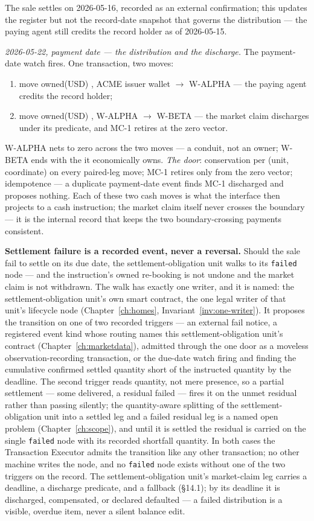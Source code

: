 The sale settles on 2026-05-16, recorded as an external confirmation; this updates
the register but not the record-date snapshot that governs the distribution --- the
paying agent still credits the record holder as of 2026-05-15.

\emph{2026-05-22, payment date --- the distribution and the discharge.} The
payment-date watch fires. One transaction, two moves:
\begin{enumerate}[label=(\arabic*),nosep]
\item move owned(USD) , ACME issuer wallet $\to$ W-ALPHA --- the paying
agent credits the record holder;
\item move owned(USD) , W-ALPHA $\to$ W-BETA --- the market claim
discharges under its predicate, and MC-1 retires at the zero vector.
\end{enumerate}
W-ALPHA nets to zero across the two moves --- a conduit, not an owner; W-BETA ends
with the  it economically owns. \emph{The door}: conservation per
(unit, coordinate) on every paired-leg move; MC-1 retires only from the zero vector;
idempotence --- a duplicate payment-date event finds MC-1 discharged and proposes
nothing. Each of these two cash moves is what the interface then projects to a cash
instruction; the market claim itself never crosses the boundary --- it is the
internal record that keeps the two boundary-crossing payments consistent.

\medskip\noindent\textbf{Settlement failure is a recorded event, never a reversal.}
Should the sale fail to settle on its due date, the settlement-obligation unit walks
to its \texttt{failed} node --- and the instruction's owned re-booking is not undone
and the market claim is not withdrawn. The walk has exactly one writer, and it is
named: the settlement-obligation unit's own smart contract, the one legal writer of
that unit's lifecycle node (Chapter~\ref{ch:homes}, Invariant~\ref{inv:one-writer}).
It proposes the transition on one of two recorded triggers --- an external fail
notice, a registered event kind whose routing names this settlement-obligation unit's
contract (Chapter~\ref{ch:marketdata}), admitted through the one door as a moveless
observation-recording transaction, or the due-date watch firing and finding the cumulative
confirmed settled quantity short of the instructed quantity by the deadline. The
second trigger reads quantity, not mere presence, so a partial settlement --- some
delivered, a residual failed --- fires it on the unmet residual rather than passing
silently; the quantity-aware splitting of the settlement-obligation unit into a
settled leg and a failed residual leg is a named open problem (Chapter~\ref{ch:scope}),
and until it is settled the residual is carried on the single \texttt{failed} node with
its recorded shortfall quantity. In both cases the Transaction Executor admits the
transition like any other transaction; no other machine writes the node, and no
\texttt{failed} node exists without one of the two triggers on the record. The settlement-obligation unit's market-claim leg carries
a deadline, a discharge predicate, and a fallback (\S14.1); by its deadline it is
discharged, compensated, or declared defaulted --- a failed distribution is a
visible, overdue item, never a silent balance edit.

